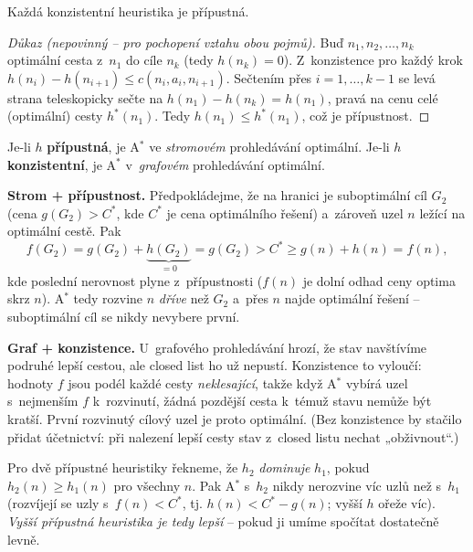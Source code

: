 \begin{lemma}
Každá konzistentní heuristika je přípustná.
\end{lemma}
\begin{proof}[Důkaz \textnormal{(nepovinný -- pro pochopení vztahu obou pojmů)}]
Buď $n_1,n_2,\dots,n_k$ optimální cesta z~$n_1$ do cíle $n_k$ (tedy $h(n_k)=0$). Z~konzistence pro každý krok $h(n_i)-h(n_{i+1})\le c(n_i,a_i,n_{i+1})$. Sečtením přes $i=1,\dots,k-1$ se levá strana teleskopicky sečte na $h(n_1)-h(n_k)=h(n_1)$, pravá na cenu celé (optimální) cesty $h^\ast(n_1)$. Tedy $h(n_1)\le h^\ast(n_1)$, což je přípustnost.
\end{proof}

\begin{veta}
Je-li $h$ \textbf{přípustná}, je A${}^\ast$ ve \emph{stromovém} prohledávání optimální. Je-li $h$ \textbf{konzistentní}, je A${}^\ast$ v~\emph{grafovém} prohledávání optimální.
\end{veta}

\begin{intuice}
\textbf{Strom + přípustnost.} Předpokládejme, že na hranici je suboptimální cíl $G_2$ (cena $g(G_2)>C^\ast$, kde $C^\ast$ je cena optimálního řešení) a~zároveň uzel $n$ ležící na optimální cestě. Pak
\[ f(G_2)=g(G_2)+\underbrace{h(G_2)}_{=0}=g(G_2)>C^\ast \ge g(n)+h(n)=f(n), \]
kde poslední nerovnost plyne z~přípustnosti ($f(n)$ je dolní odhad ceny optima skrz $n$). A${}^\ast$ tedy rozvine $n$ \emph{dříve} než $G_2$ a~přes $n$ najde optimální řešení -- suboptimální cíl se nikdy nevybere první.

\textbf{Graf + konzistence.} U~grafového prohledávání hrozí, že stav navštívíme podruhé lepší cestou, ale closed list ho už nepustí. Konzistence to vyloučí: hodnoty $f$ jsou podél každé cesty \emph{neklesající}, takže když A${}^\ast$ vybírá uzel s~nejmenším $f$ k~rozvinutí, žádná pozdější cesta k~témuž stavu nemůže být kratší. První rozvinutý cílový uzel je proto optimální. (Bez konzistence by stačilo přidat účetnictví: při nalezení lepší cesty stav z~closed listu nechat „obživnout``.)
\end{intuice}

\begin{poznamka}
Pro dvě přípustné heuristiky řekneme, že $h_2$ \emph{dominuje} $h_1$, pokud $h_2(n)\ge h_1(n)$ pro všechny $n$. Pak A${}^\ast$ s~$h_2$ nikdy nerozvine víc uzlů než s~$h_1$ (rozvíjejí se uzly s~$f(n)<C^\ast$, tj. $h(n)<C^\ast-g(n)$; vyšší $h$ ořeže víc). \emph{Vyšší přípustná heuristika je tedy lepší} -- pokud ji umíme spočítat dostatečně levně.
\end{poznamka}

